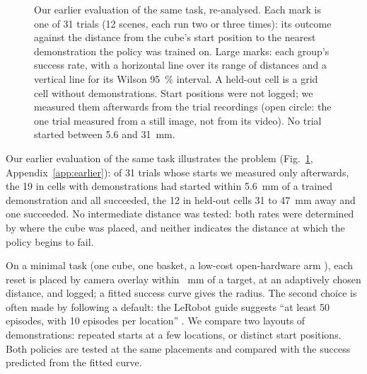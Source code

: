 \begin{figure}[t]
\centering
{}
\caption{Our earlier evaluation of the same task, re-analysed.
Each mark is one of 31 trials (12 scenes, each run two or three times): its outcome against the distance from the cube's start position to the nearest demonstration the policy was trained on. Large marks: each group's success rate, with a horizontal line over its range of distances and a vertical line for its Wilson 95~\% interval. A held-out cell is a grid cell without demonstrations. %
Start positions were not logged; we measured them afterwards from the trial recordings (open circle: the one trial measured from a still image, not from its video).
No trial started between 5.6 and 31~mm.} %
\label{fig:earlier}
\end{figure}

Our earlier evaluation of the same task illustrates the problem (Fig.~\ref{fig:earlier}, Appendix~\ref{app:earlier}): of 31 trials whose starts we measured only afterwards, the 19 in cells with demonstrations had started within 5.6~mm of a trained demonstration and all succeeded, the 12 in held-out cells 31 to 47~mm away and one succeeded. %
No intermediate distance was tested: both rates were determined by where the cube was placed, and neither indicates the distance at which the policy begins to fail. %

On a minimal task (one cube, one basket, a low-cost open-hardware arm \cite{therobotstudio2026so100}), each reset is placed by camera overlay within \placementTolerance~mm of a target, at an adaptively chosen distance, and logged; a fitted success curve gives the radius.
The second choice is often made by following a default: the LeRobot guide suggests ``at least 50 episodes, with 10 episodes per location'' \cite{huggingface2026imitation}. %
We compare two layouts of \nDemos demonstrations: repeated starts at a few locations, or \nPointsSpread distinct start positions. Both policies are tested at the same placements and compared with the success predicted from the fitted curve.
